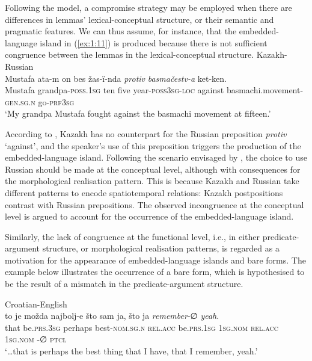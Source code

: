 Following the model, a compromise strategy may be employed when there are differences in lemmas' lexical-conceptual structure, or their semantic and pragmatic features. We can thus assume, for instance, that the embedded-language island in (\ref{ex:1:11}) is produced because there is not sufficient congruence between the lemmas in the lexical-conceptual structure.
\ea{\label{ex:1:11}}
Kazakh-Russian \citep[41--42]{muhamedowa-untersuchung-2006}\\
\gll 
Mustafa ata-m on bes žas-ï-nda \textit{protiv} \textit{basmačestv-a} ket-ken.\\
	Mustafa grandpa-\textsc{poss.1sg} ten five year-\textsc{poss3sg-loc} against basmachi.movement-\textsc{gen.sg.n} go-\textsc{prf3sg}\\
\glt `My grandpa Mustafa fought against the basmachi movement at fifteen.' 
\z

\noindent According to \citet{muhamedowa-untersuchung-2006}, Kazakh has no counterpart for the Russian preposition \textit{protiv} `against', and the speaker's use of this preposition triggers the production of the embedded-language island. Following the scenario envisaged by \citet[995]{myers-scotton-matching-1995}, the choice to use Russian should be made at the conceptual level, although with consequences for the morphological realisation pattern. This is because Kazakh and Russian take different patterns to encode spatiotemporal relations: Kazakh postpositions contrast with Russian prepositions. The observed incongruence at the conceptual level is argued to account for the occurrence of the embedded-language island.

Similarly, the lack of congruence at the functional level, i.e., in either predicate-argument structure, or morphological realisation patterns, is regarded as a motivation for the appearance of embedded-language islands and bare forms. The example below illustrates the occurrence of a bare form, which is hypothesised to be the result of a mismatch in the predicate-argument structure.

\ea{\label{ex:1:12}}
Croatian-English \citep[213]{hlavac-second-generation-2003}\\
\gll {\dots} to je možda najbolj-e što sam ja, što ja \textit{remember}-∅ \textit{yeah}.\\
	{} that be.\textsc{prs.3sg} perhaps best-\textsc{nom.sg.n} \textsc{rel.acc} be.\textsc{prs.1sg} \textsc{1sg.nom} \textsc{rel.acc} \textsc{1sg.nom} \phantom{remember}-∅ \textsc{ptcl}\\
\glt `\dots that is perhaps the best thing that I have, that I remember, yeah.'
\z

